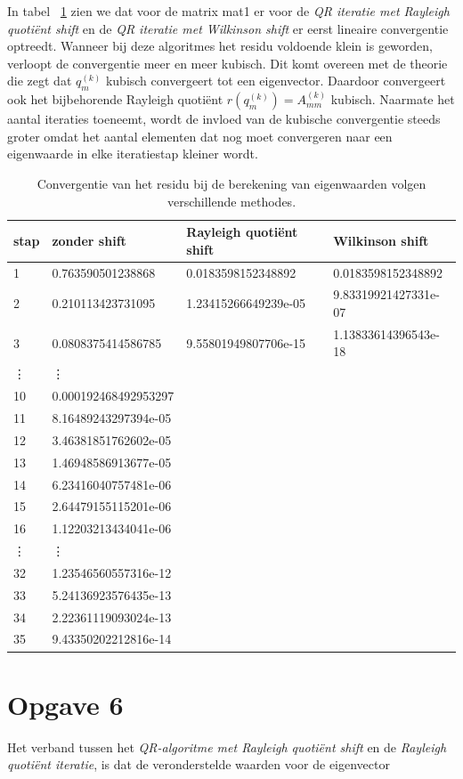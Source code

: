 \documentclass[a4paper]{article}
\newcommand{\opgave}[1]{\section*{Opgave #1}}
\begin{document}
In tabel ~\ref{table:tab1} zien we dat voor de matrix mat1 er voor de \textit{QR iteratie met Rayleigh quoti\"{e}nt shift} en de \textit{QR iteratie met Wilkinson shift} er eerst lineaire convergentie optreedt. Wanneer bij deze algoritmes het residu voldoende klein is geworden, verloopt de convergentie meer en meer kubisch. Dit komt overeen met de theorie die zegt dat $q_m^{(k)}$ kubisch convergeert tot een eigenvector. Daardoor convergeert ook het bijbehorende Rayleigh quoti\"{e}nt $r(q_m^{(k)})=A_{mm}^{(k)}$ kubisch. Naarmate het aantal iteraties toeneemt, wordt de invloed van de kubische convergentie steeds groter omdat het aantal elementen dat nog moet convergeren naar een eigenwaarde in elke iteratiestap kleiner wordt.
\begin{table}[h]
\begin{tabular}{|l|l|l|l|}
\hline
stap & zonder shift & Rayleigh quoti\"{e}nt shift & Wilkinson shift \\
\hline
1 & 0.763590501238868 & 0.0183598152348892 & 0.0183598152348892 \\
2 & 0.210113423731095 & 1.23415266649239e-05 & 9.83319921427331e-07 \\
3 & 0.0808375414586785 & 9.55801949807706e-15 & 1.13833614396543e-18 \\
\vdots & \vdots &  &  \\
10 & 0.000192468492953297 &  &  \\
11 & 8.16489243297394e-05 &  &  \\
12 & 3.46381851762602e-05 &  &  \\
13 & 1.46948586913677e-05 &  &  \\
14 & 6.23416040757481e-06 &  &  \\
15 & 2.64479155115201e-06 &  &  \\
16 & 1.12203213434041e-06 &  &  \\
\vdots & \vdots &  &  \\
32 & 1.23546560557316e-12 &  &  \\
33 & 5.24136923576435e-13 &  &  \\
34 & 2.22361119093024e-13 &  &  \\
35 & 9.43350202212816e-14 &  &  \\
\hline
\end{tabular}
\caption{Convergentie van het residu bij de berekening van eigenwaarden volgen verschillende methodes.}
\label{table:tab1}
\end{table}
\newpage
\opgave{6}
Het verband tussen het \textit{QR-algoritme met Rayleigh quoti\"{e}nt shift} en de \textit{Rayleigh quoti\"{e}nt iteratie}, is dat de veronderstelde waarden voor de eigenvector
\end{document}
